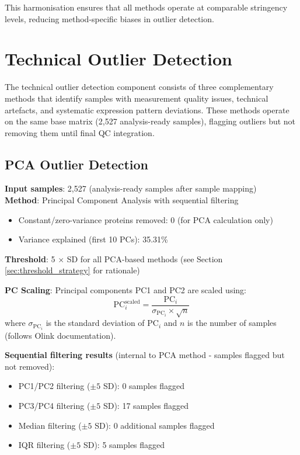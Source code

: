 \documentclass[11pt,a4paper]{article}
\begin{document}
This harmonisation ensures that all methods operate at comparable stringency levels, reducing method-specific biases in outlier detection.

\section{Technical Outlier Detection}

The technical outlier detection component consists of three complementary methods that identify samples with measurement quality issues, technical artefacts, and systematic expression pattern deviations. These methods operate on the same base matrix (2,527 analysis-ready samples), flagging outliers but not removing them until final QC integration.

\subsection{PCA Outlier Detection}
\textbf{Input samples}: 2,527 (analysis-ready samples after sample mapping)\\
\textbf{Method}: Principal Component Analysis with sequential filtering
\begin{itemize}
\item Constant/zero-variance proteins removed: 0 (for PCA calculation only)
\item Variance explained (first 10 PCs): 35.31\%
\end{itemize}

\textbf{Threshold}: 5 $\times$ SD for all PCA-based methods (see Section \ref{sec:threshold_strategy} for rationale)

\textbf{PC Scaling}: Principal components PC1 and PC2 are scaled using:
\[
\text{PC}_i^{\text{scaled}} = \frac{\text{PC}_i}{\sigma_{\text{PC}_i} \times \sqrt{n}}
\]
where $\sigma_{\text{PC}_i}$ is the standard deviation of $\text{PC}_i$ and $n$ is the number of samples (follows Olink documentation).

\textbf{Sequential filtering results} (internal to PCA method - samples flagged but not removed):
\begin{itemize}
\item PC1/PC2 filtering ($\pm 5$ SD): 0 samples flagged
\item PC3/PC4 filtering ($\pm 5$ SD): 17 samples flagged
\item Median filtering ($\pm 5$ SD): 0 additional samples flagged
\item IQR filtering ($\pm 5$ SD): 5 samples flagged
\end{itemize}
\end{document}
